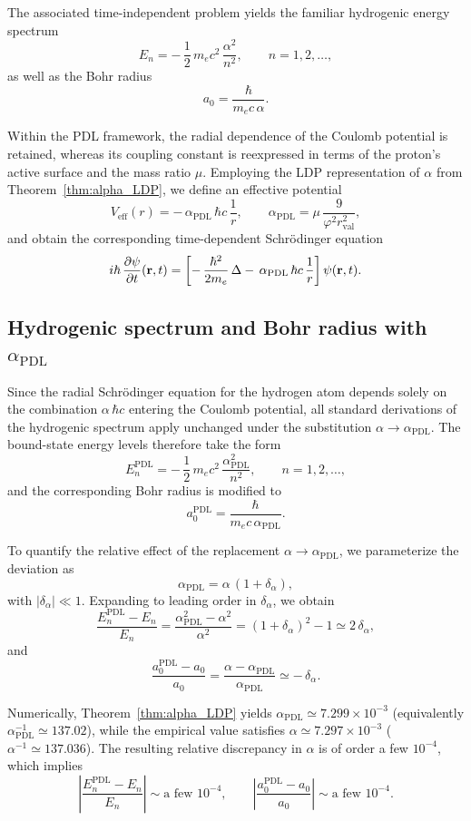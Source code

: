 \documentclass[11pt,a4paper]{article}
\theoremstyle{plain}
\theoremstyle{definition}
\theoremstyle{remark}
\begin{document}
The associated time-independent problem yields the familiar hydrogenic energy spectrum
\[
  E_n = -\,\frac{1}{2}\,m_e c^2\,\frac{\alpha^2}{n^2},
  \qquad n = 1,2,\dots,
\]
as well as the Bohr radius
\[
  a_0 = \frac{\hbar}{m_e c\,\alpha}.
\]

Within the PDL framework, the radial dependence of the Coulomb potential is retained, whereas its coupling constant is reexpressed in terms of the proton’s active surface and the mass ratio \(\mu\). Employing the LDP representation of \(\alpha\) from Theorem~\ref{thm:alpha_LDP}, we define an effective potential
\[
  V_{\mathrm{eff}}(r)= -\,\alpha_{\mathrm{PDL}}\,\hbar c\,\frac{1}{r},\qquad\alpha_{\mathrm{PDL}} = \mu\,\frac{9}{\varphi^2 r_{\mathrm{val}}^2},
\]
and obtain the corresponding time-dependent Schrödinger equation
\[
  i\hbar\,\frac{\partial \psi}{\partial t}(\vb{r},t)
  =
  \left[
    -\,\frac{\hbar^2}{2m_e}\,\Delta
    -\,\alpha_{\mathrm{PDL}}\,\hbar c\,\frac{1}{r}
  \right] \psi(\vb{r},t).
\]

\subsection{Hydrogenic spectrum and Bohr radius with \texorpdfstring{\(\alpha_{\mathrm{PDL}}\)}{alpha\_PDL}}

Since the radial Schrödinger equation for the hydrogen atom depends solely on the combination \(\alpha\,\hbar c\) entering the Coulomb potential, all standard derivations of the hydrogenic spectrum apply unchanged under the substitution \(\alpha \to \alpha_{\mathrm{PDL}}\). The bound-state energy levels therefore take the form
\[
  E_n^{\mathrm{PDL}}
  = -\,\frac{1}{2}\,m_e c^2\,\frac{\alpha_{\mathrm{PDL}}^2}{n^2},
  \qquad n = 1,2,\dots,
\]
and the corresponding Bohr radius is modified to
\[
  a_0^{\mathrm{PDL}}
  = \frac{\hbar}{m_e c\,\alpha_{\mathrm{PDL}}}.
\]

To quantify the relative effect of the replacement \(\alpha \to \alpha_{\mathrm{PDL}}\),
we parameterize the deviation as
\[
  \alpha_{\mathrm{PDL}} = \alpha\,(1 + \delta_\alpha),
\]
with \(|\delta_\alpha| \ll 1\). Expanding to leading order in \(\delta_\alpha\), we obtain
\[
  \frac{E_n^{\mathrm{PDL}} - E_n}{E_n}
  = \frac{\alpha_{\mathrm{PDL}}^2 - \alpha^2}{\alpha^2}
  = (1 + \delta_\alpha)^2 - 1
  \simeq 2\,\delta_\alpha,
\]
and
\[
  \frac{a_0^{\mathrm{PDL}} - a_0}{a_0}
  = \frac{\alpha - \alpha_{\mathrm{PDL}}}{\alpha_{\mathrm{PDL}}}
  \simeq -\,\delta_\alpha.
\]

Numerically, Theorem~\ref{thm:alpha_LDP} yields \(\alpha_{\mathrm{PDL}} \simeq 7.299\times 10^{-3}\) (equivalently \(\alpha_{\mathrm{PDL}}^{-1} \simeq 137.02\)), while the empirical value satisfies \(\alpha \simeq 7.297\times 10^{-3}\) (\(\alpha^{-1} \simeq 137.036\)). The resulting relative discrepancy in \(\alpha\) is of order a few \(10^{-4}\), which implies
\[
  \left| \frac{E_n^{\mathrm{PDL}} - E_n}{E_n} \right|
  \sim \text{a few } 10^{-4},
  \qquad
  \left| \frac{a_0^{\mathrm{PDL}} - a_0}{a_0} \right|
  \sim \text{a few } 10^{-4}.
\]
\end{document}
